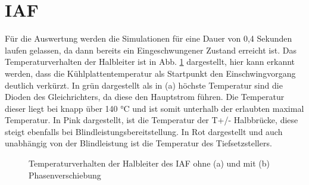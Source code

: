 \section{IAF}
Für die Auswertung werden die Simulationen für eine Dauer von 0,4 Sekunden laufen gelassen, da dann bereits ein Eingeschwungener Zustand erreicht ist. Das Temperaturverhalten der Halbleiter ist in Abb. \ref{fig:iaftemp} dargestellt, hier kann erkannt werden, dass die Kühlplattentemperatur als Startpunkt den Einschwingvorgang deutlich verkürzt. In grün dargestellt als in (a) höchste Temperatur sind die Dioden des Gleichrichters, da diese den Hauptstrom führen. Die Temperatur dieser liegt bei knapp über 140 °C und ist somit unterhalb der erlaubten maximal Temperatur. In Pink dargestellt, ist die Temperatur der T+/- Halbbrücke, diese steigt ebenfalls bei Blindleistungsbereitstellung. In Rot dargestellt und auch unabhängig von der Blindleistung ist die Temperatur des Tiefsetzstellers.  
\begin{figure}
	\centering
	\qquad
	\caption{Temperaturverhalten der Halbleiter des IAF ohne (a) und mit (b) Phasenverschiebung}
	\label{fig:iaftemp}
\end{figure}


